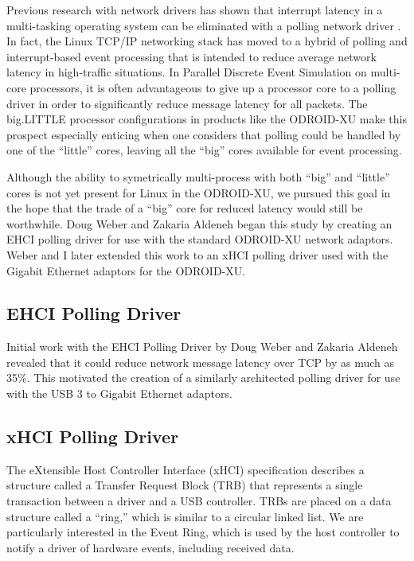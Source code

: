 \documentclass[11pt]{book}
\begin{document}
Previous research with network drivers has shown that interrupt latency in a
multi-tasking operating system can be eliminated with a polling network driver
\cite{dovrolis-01}\cite{liu-09}. In fact, the Linux TCP/IP networking stack has
moved to a hybrid of polling and interrupt-based event processing that is
intended to reduce average network latency in high-traffic situations. In
Parallel Discrete Event Simulation on multi-core processors, it is often
advantageous to give up a processor core to a polling driver in order to
significantly reduce message latency for all packets. The big.LITTLE processor
configurations in products like the ODROID-XU make this prospect especially
enticing when one considers that polling could be handled by one of the
``little'' cores, leaving all the ``big'' cores available for event processing.

Although the ability to symetrically multi-process with both ``big'' and
``little'' cores is not yet present for Linux in the ODROID-XU, we pursued this
goal in the hope that the trade of a ``big'' core for reduced latency would
still be worthwhile. Doug Weber and Zakaria Aldeneh began this study by creating
an EHCI polling driver for use with the standard ODROID-XU network
adaptors. Weber and I later extended this work to an xHCI polling driver used
with the Gigabit Ethernet adaptors for the ODROID-XU.

\subsection{\textbf{EHCI Polling Driver}}

Initial work with the EHCI Polling Driver by Doug Weber and Zakaria Aldeneh
revealed that it could reduce network message latency over TCP by as much as
35\%. This motivated the creation of a similarly architected polling driver
for use with the USB 3 to Gigabit Ethernet adaptors.

\subsection{\textbf{xHCI Polling Driver}}

The eXtensible Host Controller Interface (xHCI) specification \cite{xhci}
describes a structure called a Transfer Request Block (TRB) that represents a
single transaction between a driver and a USB controller. TRBs are placed on a
data structure called a ``ring,'' which is similar to a circular linked list. We
are particularly interested in the Event Ring, which is used by the host
controller to notify a driver of hardware events, including received data.
\end{document}
